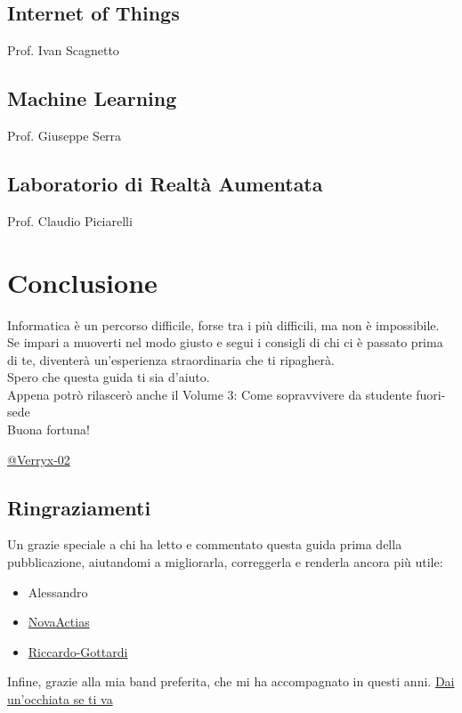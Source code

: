 \documentclass[18pt]{extarticle}
\begin{document}
\subsection{Internet of Things}
Prof. Ivan Scagnetto

\subsection{Machine Learning}
Prof. Giuseppe Serra

\subsection{Laboratorio di Realtà Aumentata}
Prof. Claudio Piciarelli








\section{Conclusione}
Informatica è un percorso difficile, forse tra i più difficili, ma non è impossibile.\\
Se impari a muoverti nel modo giusto e segui i consigli di chi ci è passato prima di te, diventerà un'esperienza straordinaria che ti ripagherà.\\
Spero che questa guida ti sia d'aiuto.\\
Appena potrò rilascerò anche il Volume 3: Come sopravvivere da studente fuori-sede
\\
Buona fortuna!

\vspace{1cm}
\begin{flushright}
\href{https://github.com/Verryx-02}{@Verryx-02}
\end{flushright}

\subsection*{Ringraziamenti}
Un grazie speciale a chi ha letto e commentato questa guida prima della pubblicazione, aiutandomi a migliorarla, correggerla e renderla ancora più utile:
\begin{itemize}
\item Alessandro
\item \href{https://github.com/NovaActias}{NovaActias}
\item \href{https://github.com/Riccardo-Gottardi}{Riccardo-Gottardi}

\end{itemize}%
Infine, grazie alla mia band preferita, che mi ha accompagnato in questi anni. \href{https://www.youtube.com/watch?v=0dG9pXeOgT0}{Dai un'occhiata se ti va}
\end{document}
